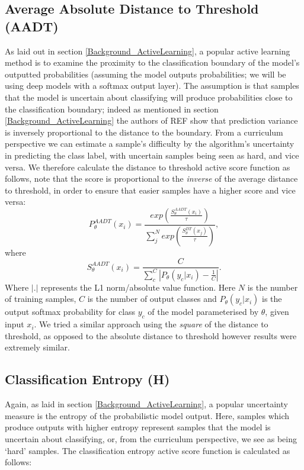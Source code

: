 \subsection{Average Absolute Distance to Threshold (AADT)}
As laid out in section \ref{Background_ActiveLearning}, a popular active learning method is to examine the proximity to the classification boundary of the model's outputted probabilities (assuming the model outputs probabilities; we will be using deep models with a softmax output layer). The assumption is that samples that the model is uncertain about classifying will produce probabilities close to the classification boundary; indeed as mentioned in section \ref{Background_ActiveLearning} the authors of REF show that prediction variance is inversely proportional to the distance to the boundary. From a curriculum perspective we can estimate a sample's difficulty by the algorithm's uncertainty in predicting the class label, with uncertain samples being seen as hard, and vice versa. 
We therefore calculate the distance to threshold active score function as follows, note that the score is proportional to the \textit{inverse} of the average distance to threshold, in order to ensure that easier samples have a higher score and vice versa:
\begin{equation}
P_{\theta}^{AADT} (x_i) = \frac{exp(\frac{S^{AADT}_{\theta}(x_i)}{\tau})}{\sum_{j}^{N} exp(\frac{S^{DT}_{\theta}(x_j)}{\tau})},
\end{equation}
where
\begin{equation}
S^{AADT}_{\theta}(x_i) = \frac{C}{ \sum_{c}^{C} \left|P_{\theta}(y_c |x_i) - \frac{1}{C}\right|}.
\end{equation}
Where $|.|$ represents the L1 norm/absolute value function.
Here $N$ is the number of training samples, $C$ is the number of output classes and $P_{\theta}(y_c |x_i)$ is the output softmax probability for class $y_c$ of the model parameterised by $\theta$, given input $x_i$. We tried a similar approach using the \textit{square} of the distance to threshold, as opposed to the absolute distance to threshold however results were extremely similar. 

\subsection{Classification Entropy (H)}
Again, as laid in section \ref{Background_ActiveLearning}, a popular uncertainty measure is the entropy of the probabilistic model output. Here, samples which produce outputs with higher entropy represent samples that the model is uncertain about classifying, or, from the curriculum perspective, we see as being `hard' samples. The classification entropy active score function is calculated as follows:

